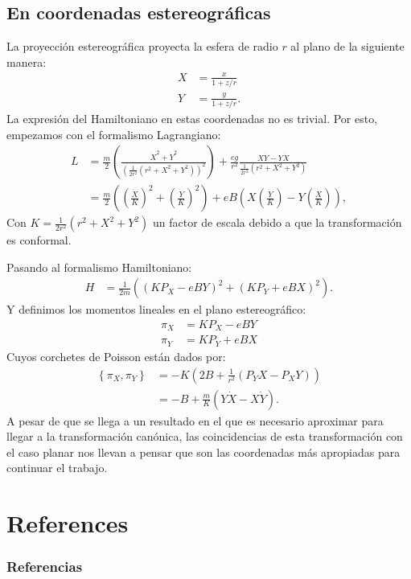 \documentclass[xcolor=dvipsnames]{beamer}
\newcommand{\roundP}[1]{\left( #1 \right)}
\newcommand{\poisson}[2]{\left\lbrace #1, #2 \right\rbrace}
\begin{document}
\subsection{En coordenadas estereográficas}
\begin{frame}
La proyección estereográfica proyecta la esfera de radio $r$ al plano de la siguiente manera:
\begin{align*}
X &= \frac{x}{1+z/r}\\
Y &= \frac{y}{1+z/r}.
\end{align*}
La expresión del Hamiltoniano en estas coordenadas no es trivial. Por esto, empezamos con el formalismo Lagrangiano:
\small
\begin{align*}
L &= \frac{m}{2}\roundP{\frac{\dot{X}^2+\dot{Y}^2}{\roundP{\frac{1}{2r^2}\roundP{r^2+X^2+Y^2}}^2}} + \frac{eg}{r^2}\frac{X\dot{Y}-Y\dot{X}}{\frac{1}{2r^2}\roundP{r^2+X^2+Y^2}} \nonumber \\
&= \frac{m}{2}\roundP{\roundP{\frac{\dot{X}}{K}}^2+\roundP{\frac{\dot{Y}}{K}}^2} + eB\roundP{X\roundP{\frac{\dot{Y}}{K}}-Y\roundP{\frac{\dot{X}}{K}}},
\end{align*}
\normalsize
Con $K=\frac{1}{2r^2}\roundP{r^2+X^2+Y^2}$ un factor de escala debido a que la transformación es conformal.

\end{frame}

\begin{frame}
Pasando al formalismo Hamiltoniano:
\begin{align*}
H &= \frac{1}{2m}\roundP{\roundP{KP_X-eBY}^2+\roundP{KP_Y+eBX}^2}.
\end{align*}
Y definimos los momentos lineales en el plano estereográfico:
\begin{align*}
\pi_X &= KP_X-eBY\\
\pi_Y &= KP_Y+eBX
\end{align*}
Cuyos corchetes de Poisson están dados por:
\begin{align*}
\poisson{\pi_X}{\pi_Y} &= -K\roundP{2B + \frac{1}{r^2}\roundP{P_YX-P_XY}}\\
 &= -B + \frac{m}{K}\roundP{Y\dot{X}-X\dot{Y}}.
\end{align*}
\small
A pesar de que se llega a un resultado en el que es necesario aproximar para llegar a la transformación canónica, las coincidencias de esta transformación con el caso planar nos llevan a pensar que son las coordenadas más apropiadas para continuar el trabajo.
\end{frame}

\section{References}
\begin{frame}[t, allowframebreaks]
\frametitle{Referencias}
\tiny


\end{frame}
\end{document}
